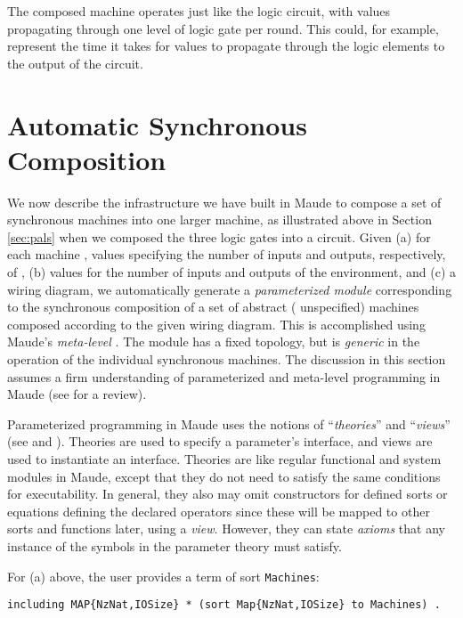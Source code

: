 \documentclass[copyright,creativecommons]{eptcs}
\begin{document}
The composed machine operates just like the logic circuit, with values
propagating through one level of logic gate per round. This could, for example,
represent the time it takes for values to propagate through the logic
elements to the output of the circuit.

\section{Automatic Synchronous Composition}
\label{sec:sc}

We now describe the infrastructure we have built in Maude to compose a set of
synchronous machines into one larger machine, as illustrated above in Section
\ref{sec:pals} when we composed the three logic gates into a circuit. Given (a)
for each machine , values  specifying the number of inputs and
outputs, respectively, of , (b) values  for the number of inputs
and outputs of the environment, and (c) a wiring diagram, we automatically
generate a \emph{parameterized module} \cite[Ch. 10]{clavel_2007_01}
corresponding to the synchronous composition of a set of abstract (
unspecified) machines composed according to the given wiring diagram. This is
accomplished using Maude's \emph{meta-level} \cite[Ch. 14]{clavel_2007_01}. The
module has a fixed topology, but is \emph{generic} in the operation of the
individual synchronous machines. The discussion in this section assumes a firm
understanding of parameterized and meta-level programming in Maude (see
\cite{clavel_2007_01} for a review).

Parameterized programming in Maude uses the notions of ``\emph{theories}'' and
``\emph{views}'' (see \cite[\S 8.3.1]{clavel_2007_01} and \cite[\S 8.3.2]{clavel_2007_01}). Theories are
used to specify a parameter's interface, and views are used to instantiate an
interface. Theories are like regular functional and system modules in Maude,
except that they do not need to satisfy the same conditions for executability.
In general, they also may omit constructors for defined sorts or equations
defining the declared operators since these will be mapped to other sorts and
functions later, using a \emph{view}. However, they can state \emph{axioms}
that any instance of the symbols in the parameter theory must satisfy.

For (a) above, the user provides a term of sort {\tt Machines}:

\begin{center}
\begin{small}
\begin{boxedminipage}{0.85\textwidth}
\begin{verbatim}
including MAP{NzNat,IOSize} * (sort Map{NzNat,IOSize} to Machines) .
\end{verbatim}
\end{boxedminipage}
\end{small}
\end{center}
\end{document}
